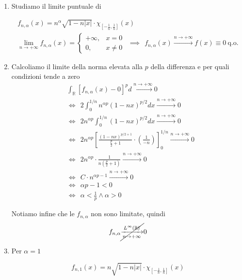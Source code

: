\Soluzione
\begin{enumerate}
\item Studiamo il limite puntuale di

\begin{gather*}
f_{n,\alpha }( x) =n^{\alpha }\sqrt{1-n| x| } \cdotp \chi _{\left[ -\frac{1}{n} ,\frac{1}{n}\right]}( x)\\
\lim\limits _{n\rightarrow +\infty } f_{n,\alpha }( x) =\begin{cases}
+\infty , & x=0\\
0, & x\neq 0
\end{cases} \ \ \implies \ \ f_{n,\alpha }( x)\xrightarrow{n\rightarrow +\infty } f( x) \equiv 0\ \text{q.o.}
\end{gather*}
\item Calcoliamo il limite della norma elevata alla $p$ della differenza e per quali condizioni tende a zero\begin{align*}
 & \int _{\mathbb{R}}[ f_{n,\alpha }( x) -0]^{p} d\xrightarrow{n\rightarrow +\infty } 0\\
 & \iff \ \ 2\int ^{1/n}_{0} n^{\alpha p}( 1-nx)^{p/2} dx\xrightarrow{n\rightarrow +\infty } 0\\
 & \iff \ \ 2n^{\alpha p}\int ^{1/n}_{0}( 1-nx)^{p/2} dx\xrightarrow{n\rightarrow +\infty } 0\\
 & \iff \ \ 2n^{\alpha p}\left[\frac{( 1-nx)^{p/2+1}}{\frac{p}{2} +1} \cdotp \left(\frac{1}{-n}\right)\right]^{1/n}_{0}\xrightarrow{n\rightarrow +\infty } 0\\
 & \iff \ \ 2n^{\alpha p} \cdotp \frac{1}{n\left(\frac{p}{2} +1\right)}\xrightarrow{n\rightarrow +\infty } 0\\
 & \iff \ \ C\cdotp n^{\alpha p-1}\xrightarrow{n\rightarrow +\infty } 0\\
 & \iff \ \ \alpha p-1< 0\\
 & \iff \ \ \alpha < \frac{1}{p} \land \alpha  >0
\end{align*}

Notiamo infine che le $f_{n,\alpha }$ non sono limitate, quindi\begin{equation*}
f_{n,\alpha }\cancel{\xrightarrow[n\rightarrow +\infty ]{L^{\infty }(\mathbb{R})}} 0
\end{equation*}
\item Per $\alpha =1$

\begin{equation*}
f_{n,1}( x) =n\sqrt{1-n| x| } \cdotp \chi _{\left[ -\frac{1}{n} ,\frac{1}{n}\right]}( x)
\end{equation*}


\end{enumerate}
